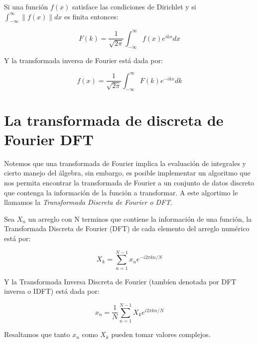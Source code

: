 \begin{definition}
  Si una función $f(x)$ satisface las condiciones de Dirichlet y si $\int_{-\infty}^{\infty} \| f(x) \| dx $
  es finita entonces:

  \begin{equation}
    F(k) = \frac{1}{\sqrt{2\pi}} \int_{-\infty}^{\infty} f(x) e^{ikx} dx
  \end{equation}

  Y la transformada inversa de Fourier está dada por:

  \begin{equation}
    f(x) = \frac{1}{\sqrt{2\pi}} \int_{-\infty}^{\infty} F(k) e^{-ikx} dk
  \end{equation}

\end{definition}

\section{La transformada de discreta de Fourier DFT}
\label{La transformada de discreta de Fourier DFT}

Notemos que una transformada de Fourier implica la evaluación de integrales y cierto manejo del álgebra, sin embargo,
es posible implementar un algoritmo que nos permita encontrar la transformada de Fourier a un conjunto de datos
discreto que contenga la información de la función a transformar. A este algortimo le llamamos
la \emph{Transformada Discreta de Fourier o DFT}.

\begin{definition}[DFT]
  Sea $X_{n}$ un arreglo con N terminos que contiene la información de una función, la Transformada
  Discreta de Fourier (DFT) de cada elemento del arreglo numérico está por:

  \begin{equation}
    X_{k} = \sum_{n = 1}^{N-1} x_{n} e^{-i2\pi kn/N}
  \end{equation}

  Y la Transformada Inversa Discreta de Fourier (tambíen denotada por DFT inversa o IDFT) está dada por:

  \begin{equation}
    x_{n} = \frac{1}{N}  \sum_{n = 1}^{N-1} X_{k} e^{i2\pi kn/N}
  \end{equation}

\end{definition}

Resaltamos que tanto $x_{n}$ como $X_{k}$ pueden tomar valores complejos.

